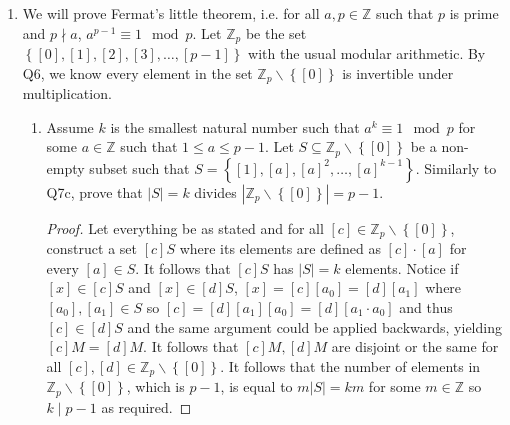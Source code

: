 \documentclass[letterpaper,12pt]{article}
\newcommand{\set}[1]{\left\{ #1 \right\}}
\begin{document}
\begin{enumerate}
\begin{enumerate}
\begin{proof}
        \end{proof}
        \item Prove that $|M|$ divides $n$. (Hint: consider equivalence classes under the relation where for all $[a], [b] \in \mathbb{Z}_n$, $[a] \sim [b]$ if and only if $[a] + [n-b] \in M$) \begin{proof}
            Let everything be as stated. For all $[c] \notin M$ but $[c] \in \mathbb{Z}_n$, construct a set $[c]+M$ where for all $[x] \in [c] + M$, $[x] = [c] + [a]$ for some $[a] \in M$. Notice by construction, $[c] + M$ has $|M|$ elements and every element in $\mathbb{Z}_n$ lies in some $[c] + M$. Notice if $[y] \in [c]+M$ and $[y] \in [d] + M$ for some $[c],[d] \in \mathbb{Z}_n$, then $[y] = [c] + [a_0] = [d] + [a_1]$ where $[a_0],[a_1] \in M$ so $[c] = [d] + [a_0] + [a_1] = d + [a_0+a_1]$ so $[c] \in [d] + M$ and the same argument could be applied backwards, yielding $[c] + M = [d] + M$. It follows that $[c]+M,[d]+M$ are disjoint or the same for all $[c],[d] \in \mathbb{Z}_n$. Hence, we know that $\mathbb{Z}_n$ is a disjoint union of sets of the form $[c] + M$, all of which have $|M|$ elements. It follows that the number of elements in $\mathbb{Z}_n$, which is $n$, is equal to $\ell|M|$ for some $\ell \in \mathbb{Z}$ so $|M|$ divides $n$ as required.
        \end{proof}
    \end{enumerate}
    \item We will prove Fermat's little theorem, i.e. for all $a ,p \in \mathbb{Z}$ such that $p$ is prime and $p \nmid a$, $a^{p-1} \equiv 1 \mod p$. Let $\mathbb{Z}_p$ be the set $\set{[0],[1],[2],[3],\ldots,[p-1]}$ with the usual modular arithmetic. By Q6, we know every element in the set $\mathbb{Z}_p \backslash \set{[0]}$ is invertible under multiplication. \begin{enumerate}
        \item Assume $k$ is the smallest natural number such that $a^k \equiv 1 \mod p$ for some $a \in \mathbb{Z}$ such that $1 \leq a \leq p-1$. Let $S \subseteq \mathbb{Z}_p \backslash \set{[0]}$ be a non-empty subset such that $S = \set{[1],[a],[a]^2, \ldots, [a]^{k-1}}$. Similarly to Q7c, prove that $|S| = k$ divides $|\mathbb{Z}_p \backslash \set{[0]}| = p-1$. \begin{proof}
            Let everything be as stated and for all $[c] \in \mathbb{Z}_p \backslash \set{[0]}$, construct a set $[c]S$ where its elements are defined as $[c] \cdot [a]$ for every $[a] \in S$. It follows that $[c] S$ has $|S| = k$ elements. Notice if $[x] \in [c]S$ and $[x] \in [d]S$, $[x] = [c][a_0] = [d][a_1]$ where $[a_0],[a_1] \in S$ so $[c] = [d][a_1][a_0] = [d][a_1 \cdot a_0]$ and thus $[c] \in [d]S$ and the same argument could be applied backwards, yielding $[c]M = [d]M$. It follows that $[c]M,[d]M$ are disjoint or the same for all $[c],[d] \in \mathbb{Z}_p \backslash \set{[0]}$. It follows that the number of elements in $\mathbb{Z}_p \backslash \set{[0]}$, which is $p-1$, is equal to $m |S| = km$ for some $m \in \mathbb{Z}$ so $k \mid p-1$ as required.

\end{proof}
\end{enumerate}
\end{enumerate}
\end{document}
